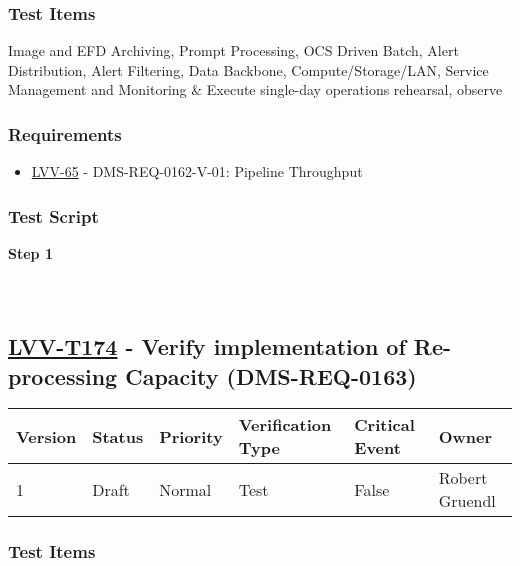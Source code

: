 \hypertarget{test-items-149}{%
\subsubsection{Test Items}\label{test-items-149}}

Image and EFD Archiving, Prompt Processing, OCS Driven Batch, Alert
Distribution, Alert Filtering, Data Backbone, Compute/Storage/LAN,
Service Management and Monitoring \& Execute single-day operations
rehearsal, observe

\hypertarget{requirements-150}{%
\subsubsection{Requirements}\label{requirements-150}}

\begin{itemize}
\tightlist
\item
  \href{https://jira.lsstcorp.org/browse/LVV-65}{LVV-65} -
  DMS-REQ-0162-V-01: Pipeline Throughput
\end{itemize}

\hypertarget{test-script-150}{%
\subsubsection{Test Script}\label{test-script-150}}

\textbf{Step 1}\\
~\\
~\\

\hypertarget{lvv-t174---verify-implementation-of-re-processing-capacity-dms-req-0163}{%
\subsection{\texorpdfstring{\href{https://jira.lsstcorp.org/secure/Tests.jspa\#/testCase/LVV-T174}{LVV-T174}
- Verify implementation of Re-processing Capacity
(DMS-REQ-0163)}{LVV-T174 - Verify implementation of Re-processing Capacity (DMS-REQ-0163)}}\label{lvv-t174---verify-implementation-of-re-processing-capacity-dms-req-0163}}

\begin{longtable}[]{@{}llllll@{}}
\toprule
Version & Status & Priority & Verification Type & Critical Event &
Owner\tabularnewline
\midrule
\endhead
1 & Draft & Normal & Test & False & Robert Gruendl\tabularnewline
\bottomrule
\end{longtable}

\hypertarget{test-items-150}{%
\subsubsection{Test Items}\label{test-items-150}}

